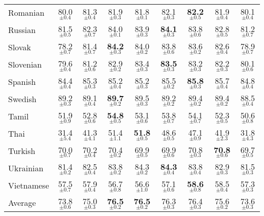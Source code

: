 \begin{table*}[ht]
{{\begin{tabular}{lcccccccc}
Romanian & 80.0$_{\pm 0.4}$ & 81.3$_{\pm 0.4}$ & 81.9$_{\pm 0.3}$ & 81.8$_{\pm 0.1}$ & 82.1$_{\pm 0.3}$ & \textbf{82.2}$_{\pm 0.5}$ & 81.9$_{\pm 0.4}$ & 80.1$_{\pm 0.4}$ \\
Russian & 81.5$_{\pm 0.5}$ & 82.3$_{\pm 0.7}$ & 84.0$_{\pm 0.1}$ & 83.9$_{\pm 0.3}$ & \textbf{84.1}$_{\pm 0.3}$ & 83.8$_{\pm 0.6}$ & 82.8$_{\pm 0.5}$ & 81.2$_{\pm 0.7}$ \\
Slovak & 78.2$_{\pm 0.7}$ & 81.4$_{\pm 0.7}$ & \textbf{84.2}$_{\pm 0.3}$ & 84.0$_{\pm 0.2}$ & 83.8$_{\pm 0.6}$ & 83.6$_{\pm 0.2}$ & 82.6$_{\pm 0.4}$ & 78.9$_{\pm 0.7}$ \\
Slovenian & 79.6$_{\pm 0.4}$ & 81.2$_{\pm 0.6}$ & 82.9$_{\pm 0.2}$ & 83.4$_{\pm 0.3}$ & \textbf{83.5}$_{\pm 0.3}$ & 83.2$_{\pm 0.3}$ & 82.2$_{\pm 0.3}$ & 80.1$_{\pm 0.6}$ \\
Spanish & 84.4$_{\pm 0.4}$ & 85.3$_{\pm 0.3}$ & 85.2$_{\pm 0.4}$ & 85.2$_{\pm 0.3}$ & 85.5$_{\pm 0.2}$ & \textbf{85.8}$_{\pm 0.3}$ & 85.7$_{\pm 0.4}$ & 84.8$_{\pm 0.4}$ \\
Swedish & 89.2$_{\pm 0.3}$ & 89.1$_{\pm 0.4}$ & \textbf{89.7}$_{\pm 0.2}$ & 89.5$_{\pm 0.3}$ & 89.2$_{\pm 0.2}$ & 89.4$_{\pm 0.2}$ & 89.4$_{\pm 0.2}$ & 88.5$_{\pm 0.4}$ \\
Tamil & 51.9$_{\pm 0.9}$ & 52.8$_{\pm 0.6}$ & \textbf{54.8}$_{\pm 0.5}$ & 53.1$_{\pm 0.6}$ & 53.8$_{\pm 0.7}$ & 54.1$_{\pm 0.7}$ & 52.3$_{\pm 0.5}$ & 50.6$_{\pm 0.8}$ \\
Thai & 31.4$_{\pm 5.4}$ & 41.3$_{\pm 4.1}$ & 51.4$_{\pm 1.1}$ & \textbf{51.8}$_{\pm 0.5}$ & 48.6$_{\pm 0.5}$ & 47.1$_{\pm 0.9}$ & 41.9$_{\pm 2.3}$ & 31.8$_{\pm 4.3}$ \\
Turkish & 70.0$_{\pm 0.7}$ & 70.2$_{\pm 0.4}$ & 70.4$_{\pm 0.2}$ & 69.9$_{\pm 0.5}$ & 69.9$_{\pm 0.6}$ & 70.8$_{\pm 0.3}$ & \textbf{70.8}$_{\pm 0.6}$ & 69.7$_{\pm 0.5}$ \\
Ukrainian & 81.4$_{\pm 0.2}$ & 82.5$_{\pm 0.4}$ & 83.8$_{\pm 0.2}$ & 84.3$_{\pm 0.2}$ & \textbf{84.3}$_{\pm 0.4}$ & 83.8$_{\pm 0.4}$ & 82.9$_{\pm 0.3}$ & 81.5$_{\pm 0.3}$ \\
Vietnamese & 57.5$_{\pm 0.7}$ & 57.9$_{\pm 0.4}$ & 56.7$_{\pm 0.8}$ & 56.6$_{\pm 1.0}$ & 57.1$_{\pm 0.6}$ & \textbf{58.6}$_{\pm 0.8}$ & 58.5$_{\pm 0.4}$ & 57.3$_{\pm 0.3}$ \\
\hline
Average & 73.8$_{\pm 0.6}$ & 75.0$_{\pm 0.3}$ & \textbf{76.5}$_{\pm 0.2}$ & \textbf{76.5}$_{\pm 0.2}$ & 76.3$_{\pm 0.3}$ & 76.4$_{\pm 0.3}$ & 75.6$_{\pm 0.2}$ & 73.6$_{\pm 0.3}$ \\
        \hline
        \end{tabular}
    }
        }
        \caption{}
        \label{table:results_mBERT_PoS-single_layer_realignment}
        \end{table*}